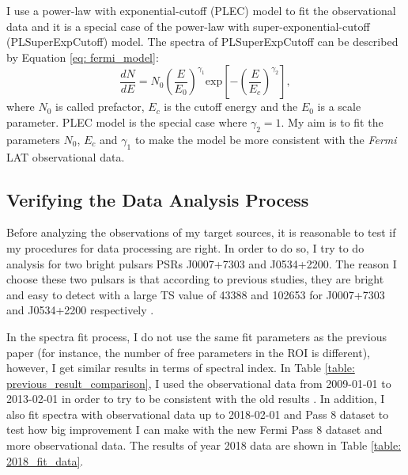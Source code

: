 \documentclass[a4paper, 12pt]{report}
\begin{document}
    I use a power-law with exponential-cutoff (PLEC) model to fit the 
    observational data and it is a special case of the power-law with 
    super-exponential-cutoff (PLSuperExpCutoff) model. The spectra of PLSuperExpCutoff 
    can be described by Equation \ref{eq: fermi_model}:  
    \begin{equation} 
      \label{eq: fermi_model}
      \frac{dN}{dE} = N_{0} \left(\frac{E}{E_0}\right)^{\gamma_1}\mbox{exp}\left[-\left(\frac{E}{E_c}\right)^{\gamma_2}\right] ,
    \end{equation}  
    where $N_0$ is called prefactor, $E_c$ is the cutoff energy and the $E_0$ is a scale 
    parameter. PLEC model is the special case where $\gamma_2=1$. My aim is to 
    fit the parameters $N_0$, $E_c$ and $\gamma_1$ to make the model be more 
    consistent with the \textit{Fermi} LAT observational data.

    \subsection{Verifying the Data Analysis Process}
      Before analyzing the observations of my target sources, it is reasonable to test 
      if my procedures for data processing are right. In order to do so, I try to do 
      analysis for two bright pulsars PSRs J0007+7303 and J0534+2200. The reason I choose 
      these two pulsars is that according to previous studies, they are bright and easy 
      to detect with a large TS value of 43388 and 102653 for J0007+7303 and J0534+2200 
      respectively \citep{0067-0049-208-2-17}.

      In the spectra fit process, I do not use the same fit parameters as the previous 
      paper (for instance, the number of free parameters in the ROI is different), 
      however, I get similar results in terms of spectral index.  
      In Table \ref{table: previous_result_comparison}, I used the observational data from 
      2009-01-01 to 2013-02-01 in order to try to be consistent with the old results 
      \citep{0067-0049-208-2-17}. In addition, I also fit spectra with 
      observational data up to 2018-02-01 and Pass 8 dataset to test how big improvement 
      I can make with the new Fermi Pass 8 dataset and more observational data. 
      The results of year 2018 data are shown in Table \ref{table: 2018_fit_data}.
\end{document}
